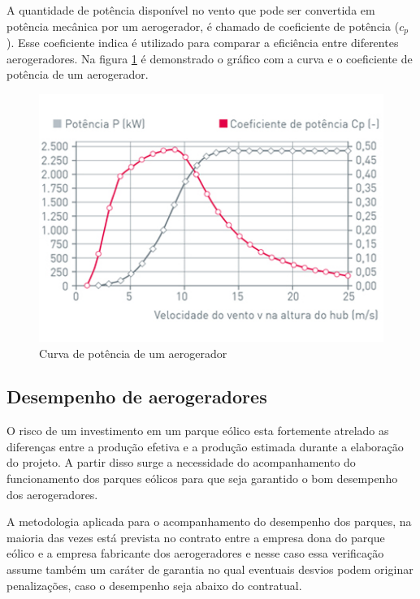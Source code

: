 A quantidade de potência disponível no vento que pode ser convertida em potência mecânica por um aerogerador, é chamado de coeficiente de potência ($c_p$). Esse coeficiente indica é utilizado para comparar a eficiência entre diferentes aerogeradores. Na figura \ref{Fig:ilustracaoCurvaPotencia} é demonstrado o gráfico com a curva e o coeficiente de potência de um aerogerador. 

\begin{figure}[htbp!] \begin{center}
\includegraphics[width=0.75\linewidth]{./figuras/curva-potencia-wobben}
\caption{Curva de potência de um aerogerador}
\label{Fig:ilustracaoCurvaPotencia}
\end{center} 
\end{figure}

\subsection{Desempenho de aerogeradores}
\label{Sec:desempenhoDeAerogeradores}

O risco de um investimento em um parque eólico esta fortemente atrelado as diferenças entre a produção efetiva e a produção estimada durante a elaboração do projeto. A partir disso surge a necessidade do acompanhamento do funcionamento dos parques eólicos para que seja garantido o bom desempenho dos aerogeradores.

A metodologia aplicada para o acompanhamento do desempenho dos parques, na maioria das vezes está prevista no contrato entre a empresa dona do parque eólico e a empresa fabricante dos aerogeradores e nesse caso essa verificação assume também um caráter de garantia no qual eventuais desvios podem originar penalizações, caso o desempenho seja abaixo do contratual.

